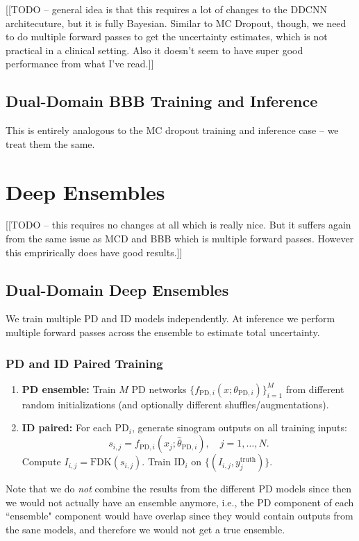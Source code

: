 \documentclass{article}
\newcommand{\0}{\varnothing}
\theoremstyle{definition}
\begin{document}
[[TODO -- general idea is that this requires a lot of changes to the DDCNN architecuture, but it is fully Bayesian. Similar to MC Dropout, though, we need to do multiple forward passes to get the uncertainty estimates, which is not practical in a clinical setting. Also it doesn't seem to have super good performance from what I've read.]]

\subsection{Dual-Domain BBB Training and Inference}

This is entirely analogous to the MC dropout training and inference case -- we treat them the same.


\section{Deep Ensembles}

[[TODO -- this requires no changes at all which is really nice. But it suffers again from the same issue as MCD and BBB which is multiple forward passes. However this emprirically does have good results.]]

\subsection{Dual-Domain Deep Ensembles}

We train multiple PD and ID models independently. At inference we perform multiple forward passes across the ensemble to estimate total uncertainty.

\subsubsection{PD and ID Paired Training}
\begin{enumerate}[1.]
  \item \textbf{PD ensemble:} Train $M$ PD networks $\{f_{\text{PD},i}(x;\theta_{\text{PD},i})\}_{i=1}^M$ from different random initializations (and optionally different shuffles/augmentations).
  \item \textbf{ID paired:} For each PD$_i$, generate sinogram outputs on all training inputs:
    \[
      s_{i,j} = f_{\text{PD},i}(x_j;\hat\theta_{\text{PD},i}),\quad j=1,\dots,N.
    \]
    Compute $I_{i,j} = \mathrm{FDK}(s_{i,j})$. Train ID$_i$ on $\{(I_{i,j},y_j^\text{truth})\}$.
\end{enumerate}
Note that we do \textit{not} combine the results from the different PD models since then we would not actually have an ensemble anymore, i.e., the PD component of each ``ensemble" component would have overlap since they would contain outputs from the sane models, and therefore we would not get a true ensemble.
\end{document}
